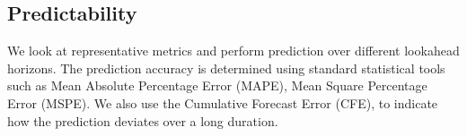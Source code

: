\subsection{Predictability}
We look at representative metrics and perform prediction over different
lookahead horizons. The prediction accuracy is determined using standard
statistical tools such as Mean Absolute Percentage Error (MAPE), Mean Square
Percentage Error (MSPE). We also use the Cumulative Forecast Error (CFE), to
indicate how the prediction deviates over a long duration.  

